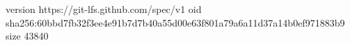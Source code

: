 version https://git-lfs.github.com/spec/v1
oid sha256:60bbd7fb32f3ee4e91b7d7b40a55d00e63f801a79a6a11d37a14b0ef971883b9
size 43840
